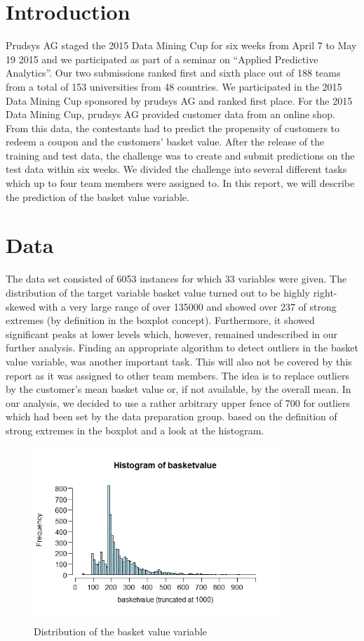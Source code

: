 \documentclass[12pt]{article}
\begin{document}
\section{Introduction}
Prudsys AG staged the 2015 Data Mining Cup for six weeks from April 7 to May 19 2015 and we participated as part of a seminar on ``Applied Predictive Analytics''. Our two submissions ranked first and sixth place out of 188 teams from a total of 153 universities from 48 countries. 
We participated in the 2015 Data Mining Cup sponsored by prudsys AG and ranked first place. 
For the 2015 Data Mining Cup, prudsys AG provided customer data from an online shop. From this data, the contestants had to predict the propensity of customers to redeem a coupon and the customers' basket value. After the release of the training and test data, the challenge was to create and submit predictions on the test data within six weeks. We divided the challenge into several different tasks which up to four team members were assigned to. In this report, we will describe the prediction of the basket value variable.\\ 

\section{Data}

The data set consisted of 6053 instances for which 33 variables were given. The distribution of the target variable basket value turned out to be highly right-skewed with a very large range  of over 135000 and showed over 237 of strong extremes (by definition in the boxplot concept). Furthermore, it showed significant peaks at lower levels which, however, remained undescribed in our further analysis. Finding an appropriate algorithm to detect outliers in the basket value variable, was another important task. This will also not be covered by this report as it was assigned to other team members.  The idea is to replace outliers by the customer's mean basket value or, if not available, by the overall mean. In our analysis, we decided to use a rather arbitrary upper fence of 700 for outliers which had been set by the data preparation group. based on the definition of strong extremes in the boxplot and a look at the histogram.

\begin{figure}[H]
\centering
\includegraphics[width=0.83\textwidth]{histbasket.jpeg}
\caption{Distribution of the basket value variable}
\end{figure}
\end{document}
